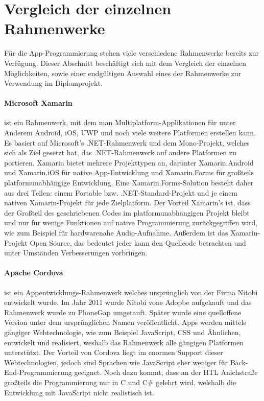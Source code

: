 \section{Vergleich der einzelnen Rahmenwerke}
%
Für die App-Programmierung stehen viele verschiedene Rahmenwerke bereits zur Verfügung.
Dieser Abschnitt beschäftigt sich mit dem Vergleich der einzelnen Möglichkeiten, sowie einer endgültigen Auswahl eines der Rahmenwerke zur Verwendung im Diplomprojekt.

\paragraph{Microsoft Xamarin}
ist ein Rahmenwerk, mit dem man Multiplatform-Applikationen für unter Anderem Android, iOS, UWP und noch viele weitere Platformen erstellen kann.
Es basiert auf Microsoft's .NET-Rahmenwerk und dem Mono-Projekt, welches sich als Ziel gesetzt hat, das .NET-Rahmenwerk auf andere Platformen zu portieren.
Xamarin bietet mehrere Projekttypen an, darunter Xamarin.Android und Xamarin.iOS für native App-Entwicklung und Xamarin.Forms für großteils platformunabhängige Entwicklung.
Eine Xamarin.Forms-Solution besteht daher aus drei Teilen: einem Portable bzw. .NET-Standard-Projekt und je einem nativen Xamarin-Projekt für jede Zielplatform.
Der Vorteil Xamarin's ist, dass der Großteil des geschriebenen Codes im platformunabhängigen Projekt bleibt und nur für wenige Funktionen auf native Programmierung zurückgegriffen wird, wie zum Beispiel für hardwarenahe Audio-Aufnahme.
Außerdem ist das Xamarin-Projekt Open Source, das bedeutet jeder kann den Quellcode betrachten und unter Umständen Verbesserungen vorbringen.

\paragraph{Apache Cordova}
ist ein Appentwicklungs-Rahmenwerk welches ursprünglich von der Firma Nitobi entwickelt wurde.
Im Jahr 2011 wurde Nitobi vone Adopbe aufgekauft und das Rahmenwerk wurde zu PhoneGap umgetauft.
Später wurde eine quelloffene Version unter dem ursprünglichen Namen veröffentlicht.
Apps werden mittels gängiger Webtechnologie, wie zum Beispiel JavaScript, CSS und Ähnlichen, entwickelt und realisiert, weshalb das Rahmenwerk alle gängigen Platformen unterstützt.
Der Vorteil von Cordova liegt im enormen Support dieser Webtechnologien, jedoch sind Sprachen wie JavaScript eher weniger für Back-End-Programmierung geeignet.
Noch dazu kommt, dass an der HTL Anichstraße großteils die Programmierung nur in C und C\# gelehrt wird, welshalb die Entwicklung mit JavaScript nicht realistisch ist.
